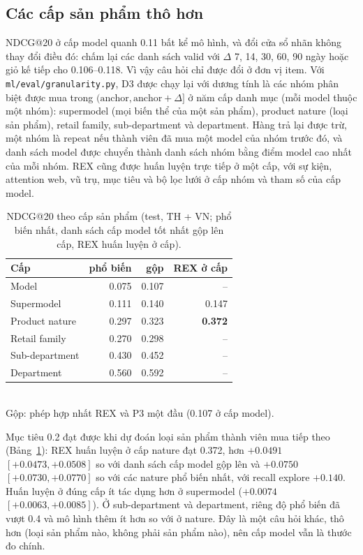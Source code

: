 \documentclass[jtehm]{ieeeaccess}
\begin{document}
\subsection{Các cấp sản phẩm thô hơn}
\label{sec:levels}
NDCG@20 ở cấp model quanh 0.11 bất kể mô hình, và đổi cửa sổ nhãn không thay đổi điều đó: chấm lại các danh sách valid với $\Delta$
7, 14, 30, 60, 90 ngày hoặc giỏ kế tiếp cho 0.106--0.118. Vì vậy câu hỏi chỉ được đổi ở đơn vị item. Với
\texttt{ml/eval/granularity.py}, D3 được chạy lại với dương tính là các nhóm phân biệt được mua trong
$(\text{anchor}, \text{anchor} + \Delta]$ ở năm cấp danh mục (mỗi model thuộc một nhóm): supermodel (mọi biến thể của một sản phẩm),
product nature (loại sản phẩm), retail family, sub-department và department. Hàng trả lại được trừ, một nhóm là repeat nếu thành viên
đã mua một model của nhóm trước đó, và danh sách model được chuyển thành danh sách nhóm bằng điểm model cao nhất của mỗi nhóm. REX
cũng được huấn luyện trực tiếp ở một cấp, với sự kiện, attention web, vũ trụ, mục tiêu và bộ lọc lưới ở cấp nhóm và tham số của cấp
model.

\begin{table}[t]
\caption{NDCG@20 theo cấp sản phẩm (test, TH + VN; phổ biến nhất, danh sách cấp model tốt nhất gộp lên cấp, REX huấn luyện ở cấp).}
\label{tab:levels}
\setlength{\tabcolsep}{4pt}
\centering
\begin{tabular}{lrrr}
\toprule
Cấp & phổ biến & gộp & REX ở cấp \\
\midrule
Model          & 0.075 & 0.107 & -- \\
Supermodel     & 0.111 & 0.140 & 0.147 \\
Product nature & 0.297 & 0.323 & \textbf{0.372} \\
Retail family  & 0.270 & 0.298 & -- \\
Sub-department & 0.430 & 0.452 & -- \\
Department     & 0.560 & 0.592 & -- \\
\bottomrule
\end{tabular}
\\[1ex]
{\footnotesize Gộp: phép hợp nhất REX và P3 một đầu (0.107 ở cấp model).}
\end{table}

Mục tiêu 0.2 đạt được khi dự đoán loại sản phẩm thành viên mua tiếp theo (Bảng~\ref{tab:levels}): REX huấn luyện ở cấp nature đạt
0.372, hơn $+0.0491$ $[+0.0473, +0.0508]$ so với danh sách cấp model gộp lên và $+0.0750$ $[+0.0730, +0.0770]$ so với các nature phổ
biến nhất, với recall explore $+0.140$. Huấn luyện ở đúng cấp ít tác dụng hơn ở supermodel ($+0.0074$ $[+0.0063, +0.0085]$). Ở
sub-department và department, riêng độ phổ biến đã vượt 0.4 và mô hình thêm ít hơn so với ở nature. Đây là một câu hỏi khác, thô hơn
(loại sản phẩm nào, không phải sản phẩm nào), nên cấp model vẫn là thước đo chính.
\end{document}
